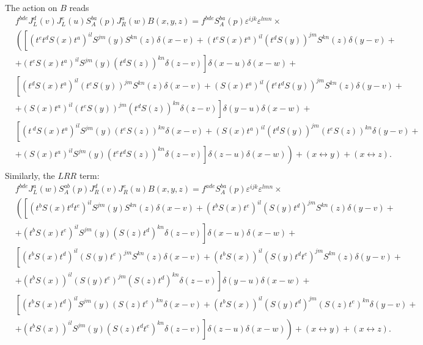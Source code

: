 \documentclass[11pt,a4paper]{article}
\begin{document}
 The action on $B$ reads  
 \begin{equation}\begin{split}
&f^{bde}J_{L}^{d}(v)J_{L}^{e}(u)S_{A}^{ba}(p)J_{R}^{a}(w)B(x,y,z)=f^{bde}S_{A}^{ba}(p)\varepsilon^{ijk}\varepsilon^{lmn}\times\\
&\left(\left[(t^{e}t^{d}S(x)t^{a})^{il}S^{jm}(y)S^{kn}(z)\delta(x-v)+(t^{e}S(x)t^{a})^{il}(t^{d}S(y))^{jm}S^{kn}(z)\delta(y-v)+\right.\right.\\
&\left.+(t^{e}S(x)t^{a})^{il}S^{jm}(y)(t^{d}S(z))^{kn}\delta(z-v)\right]\delta(x-u)\delta(x-w)+\\
&\left[(t^{d}S(x)t^{a})^{il}(t^{e}S(y))^{jm}S^{kn}(z)\delta(x-v)+(S(x)t^{a})^{il}(t^{e}t^{d}S(y))^{jm}S^{kn}(z)\delta(y-v)+\right.\\
&\left.+(S(x)t^{a})^{il}(t^{e}S(y))^{jm}(t^{d}S(z))^{kn}\delta(z-v)\right]\delta(y-u)\delta(x-w)+\\
&\left[(t^{\ d}S(x)t^{a})^{il}S^{jm}(y)(t^{e}S(z))^{kn}\delta(x-v)+(S(x)t^{a})^{il}(t^{d}S(y))^{jm}(t^{e}S(z))^{kn}\delta(y-v)+\right.\\
&\left.\left.+(S(x)t^{a})^{il}S^{jm}(y)(t^{e}t^{d}S(z))^{kn}\delta(z-v)\right]\delta(z-u)\delta(x-w)\right)+\left(x\leftrightarrow y\right)+\left(x\leftrightarrow z\right).\\
\end{split}\end{equation}
Similarly, the $LRR$ term:
 \begin{equation}\begin{split}
&f^{bde}J_{L}^{a}(w)S_{A}^{ab}(p)J_{R}^{d}(v)J_{R}^{e}(u)B(x,y,z)=f^{ade}S_{A}^{ba}(p)\varepsilon^{ijk}\varepsilon^{lmn}\times\\
&\left(\left[(t^{b}S(x)t^{d}t^{e})^{il}S^{jm}(y)S^{kn}(z)\delta(x-v)+(t^{b}S(x)t^{e})^{il}(S(y)t^{d})^{jm}S^{kn}(z)\delta(y-v)+\right.\right.\\
&\left.+(t^{b}S(x)t^{e})^{il}S^{jm}(y)(S(z)t^{d})^{kn}\delta(z-v)\right]\delta(x-u)\delta(x-w)+\\
&\left[(t^{b}S(x)t^{d})^{il}(S(y)t^{e})^{jm}S^{kn}(z)\delta(x-v)+(t^{b}S(x))^{il}(S(y)t^{d}t^{e})^{jm}S^{kn}(z)\delta(y-v)+\right.\\
&\left.+(t^{b}S(x))^{il}(S(y)t^{e})^{jm}(S(z)t^{d})^{kn}\delta(z-v)\right]\delta(y-u)\delta(x-w)+\\
&\left[(t^{b}S(x)t^{d})^{il}S^{jm}(y)(S(z)t^{e})^{kn}\delta(x-v)+(t^{b}S(x))^{il}(S(y)t^{d})^{jm}(S(z)t^{e})^{kn}\delta(y-v)+\right.\\
&\left.\left.+(t^{b}S(x))^{il}S^{jm}(y)(S(z)t^{d}t^{e})^{kn}\delta(z-v)\right]\delta(z-u)\delta(x-w)\right)+\left(x\leftrightarrow y\right)+\left(x\leftrightarrow z\right). \\
\end{split}\end{equation}
\end{document}
